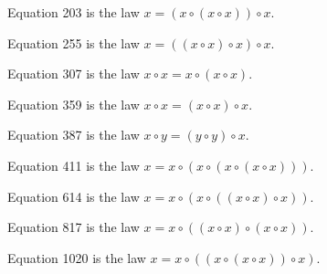 \begin{definition}[Equation 203]\label{eq203}\leanok{}  Equation 203 is the law $x = (x \circ (x \circ x)) \circ x$.
\end{definition}

\begin{definition}[Equation 255]\label{eq255}\leanok{}  Equation 255 is the law $x = ((x \circ x) \circ x) \circ x$.
\end{definition}

\begin{definition}[Equation 307]\label{eq307}\leanok{}  Equation 307 is the law $x \circ x = x \circ (x \circ x)$.
\end{definition}

\begin{definition}[Equation 359]\label{eq359}\leanok{}  Equation 359 is the law $x \circ x = (x \circ x) \circ x$.
\end{definition}

\begin{definition}[Equation 387]\label{eq387}\leanok{}  Equation 387 is the law $x \circ y = (y \circ y) \circ x$.
\end{definition}

\begin{definition}[Equation 411]\label{eq411}\leanok{}  Equation 411 is the law $x = x \circ (x \circ (x \circ (x \circ x)))$.
\end{definition}

\begin{definition}[Equation 614]\label{eq614}\leanok{}  Equation 614 is the law $x = x \circ (x \circ ((x \circ x) \circ x))$.
\end{definition}

\begin{definition}[Equation 817]\label{eq817}\leanok{}  Equation 817 is the law $x = x \circ ((x \circ x) \circ (x \circ x))$.
\end{definition}

\begin{definition}[Equation 1020]\label{eq1020}\leanok{}  Equation 1020 is the law $x = x \circ ((x \circ (x \circ x)) \circ x)$.
\end{definition}

